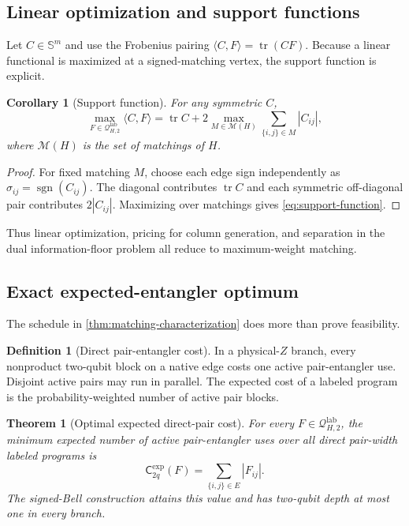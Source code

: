 \documentclass[11pt]{article}
\newtheorem{theorem}{Theorem}[section]
\newtheorem{corollary}[corollary]{Corollary}
\theoremstyle{definition}
\newtheorem{definition}[definition]{Definition}
\theoremstyle{remark}
\newcommand{\Q}{\mathcal{Q}}
\newcommand{\tr}{\operatorname{tr}}
\newcommand{\sgn}{\operatorname{sgn}}
\newcommand{\lab}{\mathrm{lab}}
\begin{document}
\subsection{Linear optimization and support functions}
Let $C\in\mathbb S^m$ and use the Frobenius pairing $\langle C,F\rangle=\tr(CF)$. Because a linear functional is maximized at a signed-matching vertex, the support function is explicit.

\begin{corollary}[Support function]
\label{cor:support-function}
For any symmetric $C$,
\begin{equation}
  \max_{F\in\Q^{\lab}_{H,2}}\langle C,F\rangle
  =\tr C+2\max_{M\in\mathcal M(H)}\sum_{\{i,j\}\in M}|C_{ij}|,
  \label{eq:support-function}
\end{equation}
where $\mathcal M(H)$ is the set of matchings of $H$.
\end{corollary}

\begin{proof}
For fixed matching $M$, choose each edge sign independently as $\sigma_{ij}=\sgn(C_{ij})$. The diagonal contributes $\tr C$ and each symmetric off-diagonal pair contributes $2|C_{ij}|$. Maximizing over matchings gives \cref{eq:support-function}.
\end{proof}

Thus linear optimization, pricing for column generation, and separation in the dual information-floor problem all reduce to maximum-weight matching.

\subsection{Exact expected-entangler optimum}
The schedule in \cref{thm:matching-characterization} does more than prove feasibility.

\begin{definition}[Direct pair-entangler cost]
In a physical-$Z$ branch, every nonproduct two-qubit block on a native edge costs one active pair-entangler use. Disjoint active pairs may run in parallel. The expected cost of a labeled program is the probability-weighted number of active pair blocks.
\end{definition}

\begin{theorem}[Optimal expected direct-pair cost]
\label{thm:expected-entangler}
For every $F\in\Q^{\lab}_{H,2}$, the minimum expected number of active pair-entangler uses over all direct pair-width labeled programs is
\begin{equation}
  \mathsf C_{2q}^{\mathrm{exp}}(F)
  =\sum_{\{i,j\}\in E}|F_{ij}|.
  \label{eq:expected-entangler-cost}
\end{equation}
The signed-Bell construction attains this value and has two-qubit depth at most one in every branch.
\end{theorem}
\end{document}
